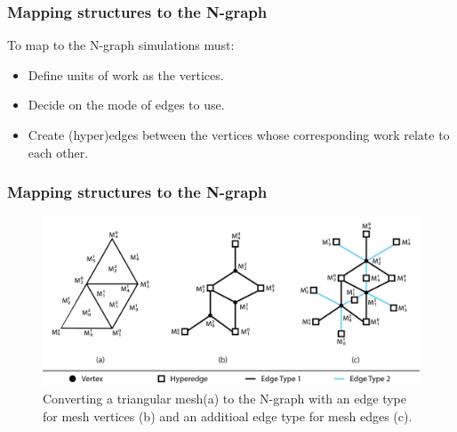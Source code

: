 \documentclass{beamer}
\begin{document}
\begin{frame}
  \frametitle{Mapping structures to the N-graph}
  To map to the N-graph simulations must:
  \begin{itemize}
  \item Define units of work as the vertices.
  \item Decide on the mode of edges to use.
  \item Create (hyper)edges between the vertices whose corresponding work relate to each other.
  \end{itemize}
\end{frame}
\begin{frame}
  \frametitle{Mapping structures to the N-graph}

  \begin{figure}
    \centering
    \includegraphics[width=.9\textwidth]{figures/exampleMesh2Graph.png}
    \caption{Converting a triangular mesh(a) to the N-graph with an edge type for mesh vertices (b) and an additioal edge type for mesh edges (c).}
  \end{figure}
\end{frame}
\end{document}

